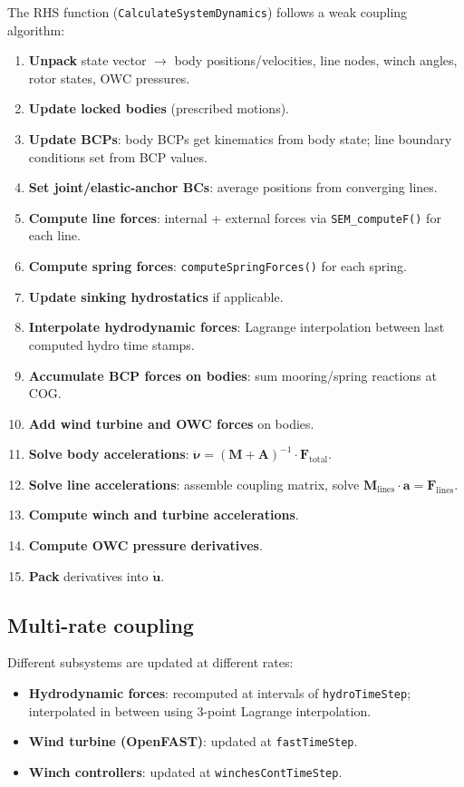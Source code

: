 \documentclass[11pt]{article}
\begin{document}
The RHS function (\texttt{CalculateSystemDynamics}) follows a weak coupling algorithm:

\begin{enumerate}
    \item \textbf{Unpack} state vector $\to$ body positions/velocities, line nodes, winch angles, rotor states, OWC pressures.
    \item \textbf{Update locked bodies} (prescribed motions).
    \item \textbf{Update BCPs}: body BCPs get kinematics from body state; line boundary conditions set from BCP values.
    \item \textbf{Set joint/elastic-anchor BCs}: average positions from converging lines.
    \item \textbf{Compute line forces}: internal + external forces via \texttt{SEM\_computeF()} for each line.
    \item \textbf{Compute spring forces}: \texttt{computeSpringForces()} for each spring.
    \item \textbf{Update sinking hydrostatics} if applicable.
    \item \textbf{Interpolate hydrodynamic forces}: Lagrange interpolation between last computed hydro time stamps.
    \item \textbf{Accumulate BCP forces on bodies}: sum mooring/spring reactions at COG.
    \item \textbf{Add wind turbine and OWC forces} on bodies.
    \item \textbf{Solve body accelerations}: $\ddot{\boldsymbol{\nu}} = (\mathbf{M}+\mathbf{A})^{-1}\cdot\mathbf{F}_{\text{total}}$.
    \item \textbf{Solve line accelerations}: assemble coupling matrix, solve $\mathbf{M}_{\text{lines}}\cdot\mathbf{a} = \mathbf{F}_{\text{lines}}$.
    \item \textbf{Compute winch and turbine accelerations}.
    \item \textbf{Compute OWC pressure derivatives}.
    \item \textbf{Pack} derivatives into $\dot{\mathbf{u}}$.
\end{enumerate}

\subsection{Multi-rate coupling}

Different subsystems are updated at different rates:
\begin{itemize}
    \item \textbf{Hydrodynamic forces}: recomputed at intervals of \texttt{hydroTimeStep}; interpolated in between using 3-point Lagrange interpolation.
    \item \textbf{Wind turbine (OpenFAST)}: updated at \texttt{fastTimeStep}.
    \item \textbf{Winch controllers}: updated at \texttt{winchesContTimeStep}.
\end{itemize}
\end{document}
